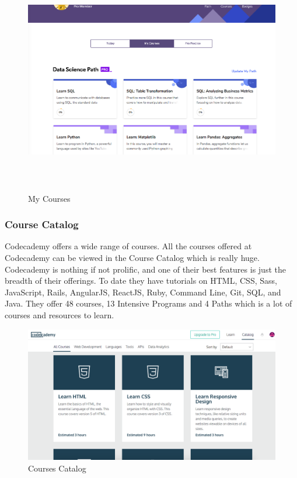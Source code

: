 \newpage
\begin{figure}[h]
	\label{ss}    %
	\centering
	\includegraphics[width= 15 cm, height=10cm]{mycourses.png}
	\caption{My Courses}
\end{figure}

\subsubsection {Course Catalog}
Codecademy offers a wide range of courses. All the courses offered at Codecademy can be viewed in the Course Catalog which is really huge. Codecademy is nothing if not prolific, and one of their best features is just the breadth of their offerings. To date they have tutorials on HTML, CSS, Sass, JavaScript, Rails, AngularJS, ReactJS, Ruby, Command Line, Git, SQL, and Java. They offer 48 courses, 13 Intensive Programs and 4 Paths which is a lot of courses and resources to learn.

\begin{figure}[h]
	\label{ss}    %
	\centering
	\includegraphics[width= 10 cm]{coursecatalog.png}
	\caption{Courses Catalog}
\end{figure}

